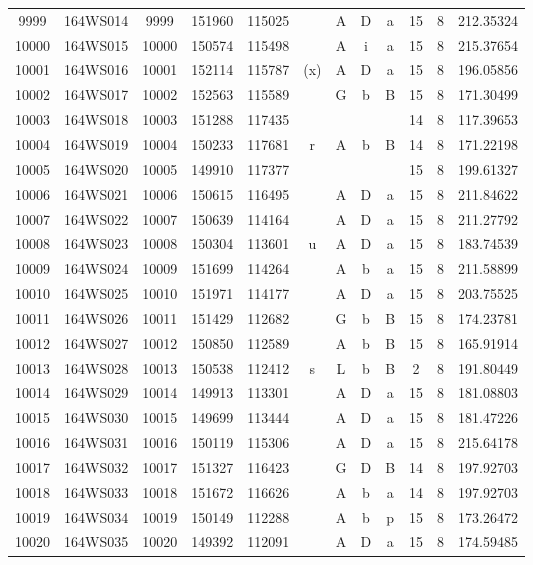 \begin{tabular}{|*{12}{c|}}
9999 & 164WS014 & 9999 & 151960 & 115025 &  & A & D & a & 15 & 8 & 212.35324 \\ 
10000 & 164WS015 & 10000 & 150574 & 115498 &  & A & i & a & 15 & 8 & 215.37654 \\ 
10001 & 164WS016 & 10001 & 152114 & 115787 & (x) & A & D & a & 15 & 8 & 196.05856 \\ 
10002 & 164WS017 & 10002 & 152563 & 115589 &  & G & b & B & 15 & 8 & 171.30499 \\ 
10003 & 164WS018 & 10003 & 151288 & 117435 &  &  &  &  & 14 & 8 & 117.39653 \\ 
10004 & 164WS019 & 10004 & 150233 & 117681 & r & A & b & B & 14 & 8 & 171.22198 \\ 
10005 & 164WS020 & 10005 & 149910 & 117377 &  &  &  &  & 15 & 8 & 199.61327 \\ 
10006 & 164WS021 & 10006 & 150615 & 116495 &  & A & D & a & 15 & 8 & 211.84622 \\ 
10007 & 164WS022 & 10007 & 150639 & 114164 &  & A & D & a & 15 & 8 & 211.27792 \\ 
10008 & 164WS023 & 10008 & 150304 & 113601 & u & A & D & a & 15 & 8 & 183.74539 \\ 
10009 & 164WS024 & 10009 & 151699 & 114264 &  & A & b & a & 15 & 8 & 211.58899 \\ 
10010 & 164WS025 & 10010 & 151971 & 114177 &  & A & D & a & 15 & 8 & 203.75525 \\ 
10011 & 164WS026 & 10011 & 151429 & 112682 &  & G & b & B & 15 & 8 & 174.23781 \\ 
10012 & 164WS027 & 10012 & 150850 & 112589 &  & A & b & B & 15 & 8 & 165.91914 \\ 
10013 & 164WS028 & 10013 & 150538 & 112412 & s & L & b & B & 2 & 8 & 191.80449 \\ 
10014 & 164WS029 & 10014 & 149913 & 113301 &  & A & D & a & 15 & 8 & 181.08803 \\ 
10015 & 164WS030 & 10015 & 149699 & 113444 &  & A & D & a & 15 & 8 & 181.47226 \\ 
10016 & 164WS031 & 10016 & 150119 & 115306 &  & A & D & a & 15 & 8 & 215.64178 \\ 
10017 & 164WS032 & 10017 & 151327 & 116423 &  & G & D & B & 14 & 8 & 197.92703 \\ 
10018 & 164WS033 & 10018 & 151672 & 116626 &  & A & b & a & 14 & 8 & 197.92703 \\ 
10019 & 164WS034 & 10019 & 150149 & 112288 &  & A & b & p & 15 & 8 & 173.26472 \\ 
10020 & 164WS035 & 10020 & 149392 & 112091 &  & A & D & a & 15 & 8 & 174.59485 \\ 

\end{tabular}
